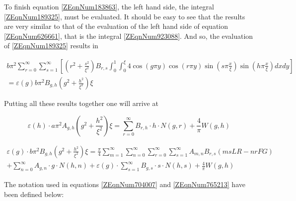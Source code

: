 To finish equation \eqref{ZEqnNum183863}, the left hand side, the integral \eqref{ZEqnNum189325},
must be evaluated. It should be easy to see that the results are very similar to that of the
evaluation of the left hand side of equation \eqref{ZEqnNum626661}, that is the integral
\eqref{ZEqnNum923088}. And so, the evaluation of \eqref{ZEqnNum189325} results in

\begin{equation} \label{3.38)} \begin{array}{l} 
    b \pi ^{2} \sum _{r=0}^{\infty} \sum _{s=1}^{\infty } 
        \left[\left(r^{2} + \frac{s^{2} }{\xi ^{2} } \right) 
        B_{r,s} \int _{0}^{1} \int _{0}^{\xi } 
        4 \cos \left(g\pi y\right) \cos \left(r \pi y\right)
        \sin \left(s\pi \frac{x}{\xi} \right)
        \sin \left(h\pi \frac{x}{\xi} \right) dxdy \right] \\ 
    = \varepsilon (g)b\pi ^{2} B_{g,h} \left(g^{2}
        +\frac{h^{2} }{\xi ^{2} } \right)\xi
\end{array} \end{equation}

Putting all these results together one will arrive at

\begin{equation} \label{ZEqnNum704007} 
    \varepsilon \left(h\right)\cdot a \pi ^{2} A_{g,h} \left(g^{2} 
    + \frac{h^{2} }{\xi ^{2} } \right) \xi 
    = \sum _{r=0}^{\infty} B_{r,h} \cdot h \cdot N \left(g,r\right) 
    + \frac{4}{\pi} W \left(g, h\right)
\end{equation}

\begin{equation} \label{ZEqnNum765213} 
    \begin{array}{l} 
    \varepsilon \left(g\right) \cdot b \pi ^{2} B_{g,h} 
    \left(g^{2} + \frac{h^{2}}{\xi ^{2}}\right) \xi 
    = \frac{\pi }{4} 
    \sum _{m=1}^{\infty } \sum _{n=0}^{\infty } \sum_{r=0}^{\infty } \sum _{s=1}^{\infty}
    A_{m,n} B_{r,s} \left(msLR - nrFG\right) \\
    + \sum _{n=0}^{\infty} A_{g,n} \cdot g \cdot N \left(h, n\right) 
    + \varepsilon \left(g \right) \cdot \sum _{s=1}^{\infty} B_{g,s} 
    \cdot s\cdot N\left(h, s\right) + \frac{4}{\pi } W\left(g,h\right)
\end{array} \end{equation}

The notation used in equations \eqref{ZEqnNum704007} and \eqref{ZEqnNum765213}
have been defined below:

